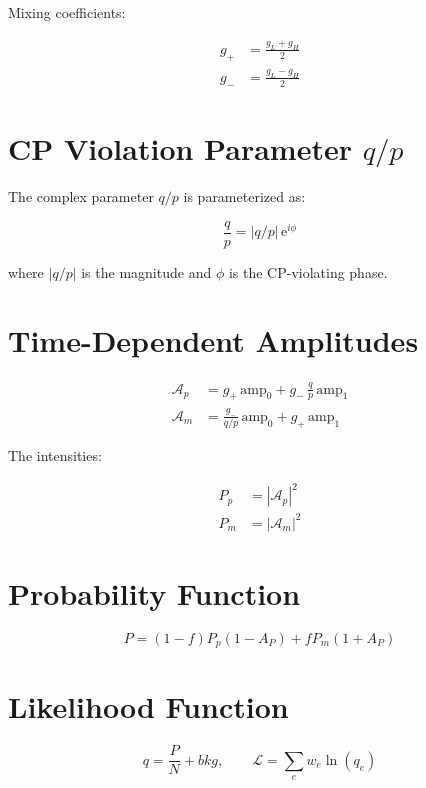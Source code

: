 \documentclass[12pt,a4paper]{article}
\newcommand{\ee}{\mathrm{e}}
\begin{document}
Mixing coefficients:

\begin{align}
g_+ &= \frac{g_L + g_H}{2} \\
g_- &= \frac{g_L - g_H}{2}
\end{align}

\section{CP Violation Parameter $q/p$}

The complex parameter $q/p$ is parameterized as:

\begin{equation}
\frac{q}{p} = |q/p| \, \ee^{i\phi}
\end{equation}

where $|q/p|$ is the magnitude and $\phi$ is the CP-violating phase.

\section{Time-Dependent Amplitudes}

\begin{align}
\mathcal{A}_p &= g_+ \, \text{amp}_0 + g_- \, \frac{q}{p} \, \text{amp}_1 \\
\mathcal{A}_m &= \frac{g_-}{q/p} \, \text{amp}_0 + g_+ \, \text{amp}_1
\end{align}

The intensities:

\begin{align}
P_p &= |\mathcal{A}_p|^2 \\
P_m &= |\mathcal{A}_m|^2
\end{align}

\section{Probability Function}

\begin{equation}
P = (1 - f) P_p (1 - A_P) + f P_m (1 + A_P)
\end{equation}

\section{Likelihood Function}

\begin{equation}
q = \frac{P}{N} + bkg, \qquad \mathcal{L} = \sum_e w_e \ln(q_e)
\end{equation}
\end{document}

